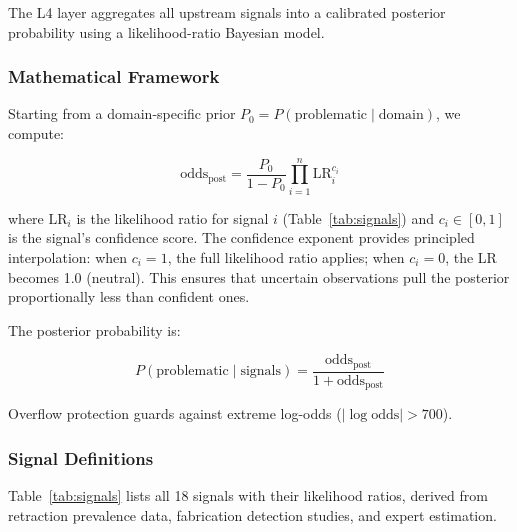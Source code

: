 \documentclass[sigconf,nonacm]{acmart}
\begin{document}
The L4 layer aggregates all upstream signals into a calibrated posterior probability using a likelihood-ratio Bayesian model.

\subsubsection{Mathematical Framework}

Starting from a domain-specific prior $P_0 = P(\text{problematic} \mid \text{domain})$, we compute:

\begin{equation}
\text{odds}_{\text{post}} = \frac{P_0}{1 - P_0} \prod_{i=1}^{n} \text{LR}_i^{c_i}
\label{eq:bayes}
\end{equation}

\noindent where $\text{LR}_i$ is the likelihood ratio for signal $i$ (Table~\ref{tab:signals}) and $c_i \in [0, 1]$ is the signal's confidence score.
The confidence exponent provides principled interpolation: when $c_i = 1$, the full likelihood ratio applies; when $c_i = 0$, the LR becomes 1.0 (neutral).
This ensures that uncertain observations pull the posterior proportionally less than confident ones.

The posterior probability is:

\begin{equation}
P(\text{problematic} \mid \text{signals}) = \frac{\text{odds}_{\text{post}}}{1 + \text{odds}_{\text{post}}}
\label{eq:posterior}
\end{equation}

Overflow protection guards against extreme log-odds ($|\log \text{odds}| > 700$).

\subsubsection{Signal Definitions}

Table~\ref{tab:signals} lists all 18 signals with their likelihood ratios, derived from retraction prevalence data, fabrication detection studies, and expert estimation.
\end{document}
